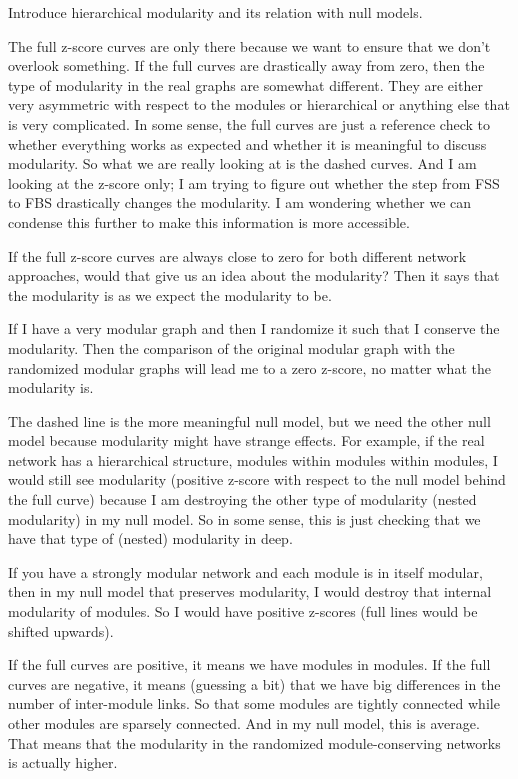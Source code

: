 

{\color{red}
	Introduce hierarchical modularity and its relation with null models.
	
	The full z-score curves are only there because we want to ensure that we don't overlook something. If the full curves are drastically away from zero, then the type of modularity in the real graphs are somewhat different. They are either very asymmetric with respect to the modules or hierarchical or anything else that is very complicated. In some sense, the full curves are just a reference check to whether everything works as expected and whether it is meaningful to discuss modularity. So what we are really looking at is the dashed curves. And I am looking at the z-score only; I am trying to figure out whether the step from FSS to FBS drastically changes the modularity. I am wondering whether we can condense this further to make this information is more accessible.
	
	If the full z-score curves are always close to zero for both different network approaches, would that give us an idea about the modularity? Then it says that the modularity is as we expect the modularity to be. 
	
	If I have a very modular graph and then I randomize it such that I conserve the modularity. Then the comparison of the original modular graph with the randomized modular graphs will lead me to a zero z-score, no matter what the modularity is. 
	
	The dashed line is the more meaningful null model, but we need the other null model because modularity might have strange effects. For example, if the real network has a hierarchical structure, modules within modules within modules, I would still see modularity (positive z-score with respect to the null model behind the full curve) because I am destroying the other type of modularity (nested modularity) in my null model. So in some sense, this is just checking that we have that type of (nested) modularity in deep.
	
	If you have a strongly modular network and each module is in itself modular, then in my null model that preserves modularity, I would destroy that internal modularity of modules. So I would have positive z-scores (full lines would be shifted upwards).
	
	If the full curves are positive, it means we have modules in modules. If the full curves are negative, it means (guessing a bit) that we have big differences in the number of inter-module links. So that some modules are tightly connected while other modules are sparsely connected. And in my null model, this is average. That means that the modularity in the randomized module-conserving networks is actually higher.
	
}
